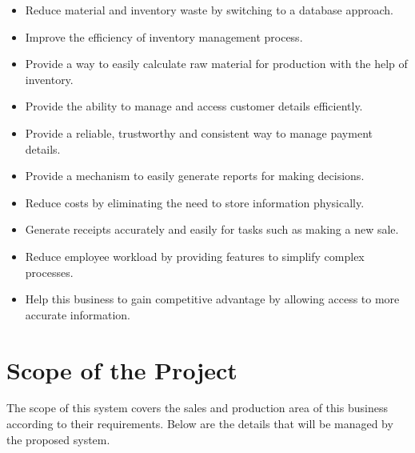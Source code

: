 \documentclass[12pt]{report}
\begin{document}
\begin{itemize}
	\item Reduce material and inventory waste by switching to a database approach.

	\item Improve the efficiency of inventory management process.

	\item Provide a way to easily calculate raw material for production with the help of inventory.

	\item Provide the ability to manage and access customer details efficiently.

	\item Provide a reliable,  trustworthy and consistent way to manage payment details.

	\item Provide a mechanism to easily generate reports for making decisions.

	\item Reduce costs by eliminating the need to store information physically.

	\item Generate receipts accurately and easily for tasks such as making a new sale.

	\item Reduce employee workload by providing features to simplify complex processes.

	\item Help this business to gain competitive advantage by allowing access to more accurate information.
\end{itemize}

\section{Scope of the Project}
The scope of this system covers the sales and production area of this business according to their requirements. Below are the details that will be managed by the proposed system.

\end{document}
